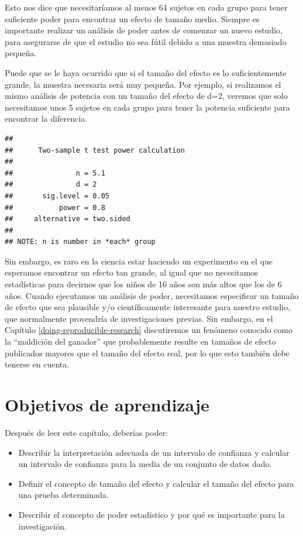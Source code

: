 \documentclass[
  12pt,
]{book}
\providecommand{\tightlist}{%
  \setlength{\itemsep}{0pt}\setlength{\parskip}{0pt}}
\begin{document}
Esto nos dice que necesitaríamos al menos 64 sujetos en cada grupo para tener suficiente poder para encontrar un efecto de tamaño medio. Siempre es importante realizar un análisis de poder antes de comenzar un nuevo estudio, para asegurarse de que el estudio no sea fútil debido a una muestra demasiado pequeña.

Puede que se le haya ocurrido que si el tamaño del efecto es lo suficientemente grande, la muestra necesaria será muy pequeña. Por ejemplo, si realizamos el mismo análisis de potencia con un tamaño del efecto de d=2, veremos que solo necesitamos unos 5 sujetos en cada grupo para tener la potencia suficiente para encontrar la diferencia.

\begin{verbatim}
## 
##      Two-sample t test power calculation 
## 
##               n = 5.1
##               d = 2
##       sig.level = 0.05
##           power = 0.8
##     alternative = two.sided
## 
## NOTE: n is number in *each* group
\end{verbatim}

Sin embargo, es raro en la ciencia estar haciendo un experimento en el que esperamos encontrar un efecto tan grande, al igual que no necesitamos estadísticas para decirnos que los niños de 16 años son más altos que los de 6 años. Cuando ejecutamos un análisis de poder, necesitamos especificar un tamaño de efecto que sea plausible y/o científicamente interesante para nuestro estudio, que normalmente provendría de investigaciones previas. Sin embargo, en el Capítulo \ref{doing-reproducible-research} discutiremos un fenómeno conocido como la ``maldición del ganador'' que probablemente resulte en tamaños de efecto publicados mayores que el tamaño del efecto real, por lo que esto también debe tenerse en cuenta.

\hypertarget{objetivos-de-aprendizaje-9}{%
\section{Objetivos de aprendizaje}\label{objetivos-de-aprendizaje-9}}

Después de leer este capítulo, deberías poder:

\begin{itemize}
\tightlist
\item
  Describir la interpretación adecuada de un intervalo de confianza y calcular un intervalo de confianza para la media de un conjunto de datos dado.
\item
  Definir el concepto de tamaño del efecto y calcular el tamaño del efecto para una prueba determinada.
\item
  Describir el concepto de poder estadístico y por qué es importante para la investigación.
\end{itemize}
\end{document}
